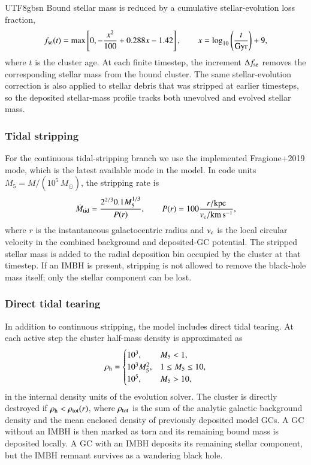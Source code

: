 \documentclass[trackchanges, twocolappendix, twocolumn]{aastex701}
\begin{document}
\begin{CJK*}{UTF8}{gbsn}
Bound stellar mass is reduced by a cumulative stellar-evolution loss fraction,
\begin{equation}
f_{\rm se}(t)=
\max\left[
0,
-\frac{x^2}{100}+0.288x-1.42
\right],
\qquad
x=\log_{10}\left(\frac{t}{\rm Gyr}\right)+9 ,
\label{eq:stellar_evolution}
\end{equation}
where \(t\) is the cluster age. At each finite timestep, the increment \(\Delta f_{\rm se}\) removes the corresponding stellar mass from the bound cluster. The same stellar-evolution correction is also applied to stellar debris that was stripped at earlier timesteps, so the deposited stellar-mass profile tracks both unevolved and evolved stellar mass.

\subsubsection{Tidal stripping} \label{subsubsect:tidal_stripping}

For the continuous tidal-stripping branch we use the implemented Fragione+2019 mode, which is the latest available mode in the model. In code units \(M_5=M/(10^5\,M_{\odot})\), the stripping rate is
\begin{equation}
\dot{M}_{\rm tid}
=\frac{2^{2/3}0.1M_5^{1/3}}{P(r)},
\qquad
P(r)=100\frac{r/{\rm kpc}}{v_{\rm c}/{\rm km\,s^{-1}}},
\label{eq:tidal_stripping}
\end{equation}
where \(r\) is the instantaneous galactocentric radius and \(v_{\rm c}\) is the local circular velocity in the combined background and deposited-GC potential. The stripped stellar mass is added to the radial deposition bin occupied by the cluster at that timestep. If an IMBH is present, stripping is not allowed to remove the black-hole mass itself; only the stellar component can be lost.

\subsubsection{Direct tidal tearing} \label{subsubsect:direct_tidal_tearing}

In addition to continuous stripping, the model includes direct tidal tearing. At each active step the cluster half-mass density is approximated as
\begin{equation}
\rho_{\rm h}=
\begin{cases}
10^3, & M_5<1,\\
10^3M_5^2, & 1\le M_5\le 10,\\
10^5, & M_5>10,
\end{cases}
\label{eq:cluster_density}
\end{equation}
in the internal density units of the evolution solver. The cluster is directly destroyed if \(\rho_{\rm h}<\rho_{\rm tot}(r)\), where \(\rho_{\rm tot}\) is the sum of the analytic galactic background density and the mean enclosed density of previously deposited model GCs. A GC without an IMBH is then marked as torn and its remaining bound mass is deposited locally. A GC with an IMBH deposits its remaining stellar component, but the IMBH remnant survives as a wandering black hole.


\end{CJK*}
\end{document}
